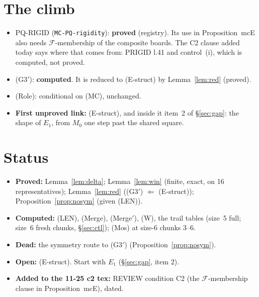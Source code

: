 \documentclass[11pt]{article}
\theoremstyle{definition}\newtheorem{definition}[theorem]{Definition}\newtheorem{remark}[theorem]{Remark}
\begin{document}
\section{The climb}\label{sec:climb}
\begin{itemize}
\item PQ-RIGID (\texttt{MC-PQ-rigidity}): \textbf{proved} (registry). Its use in Proposition~mcE also needs $\mathcal F$-membership of the composite boards. The C2 clause added today says where that comes from: PRIGID l.41 and control~(i), which is computed, not proved.
\item (G3$'$): \textbf{computed}. It is reduced to (E-struct) by Lemma~\ref{lem:red} (proved).
\item (Role): conditional on (MC), unchanged.
\item \textbf{First unproved link:} (E-struct), and inside it item~2 of \S\ref{sec:gap}: the shape of $E_1$, from $M_0$ one step past the shared square.
\end{itemize}

\section{Status}
\begin{itemize}
\item \textbf{Proved:} Lemma~\ref{lem:delta}; Lemma~\ref{lem:win} (finite, exact, on 16 representatives); Lemma~\ref{lem:red} ((G3$'$) $\Leftarrow$ (E-struct)); Proposition~\ref{prop:nosym} (given (LEN)).
\item \textbf{Computed:} (LEN), (Merge), (Merge$'$), (W), the trail tables (size~5 full; size~6 fresh chunks, \S\ref{sec:ctl}); (Mos) at size-6 chunks 3--6.
\item \textbf{Dead:} the symmetry route to (G3$'$) (Proposition~\ref{prop:nosym}).
\item \textbf{Open:} (E-struct). Start with $E_1$ (\S\ref{sec:gap}, item 2).
\item \textbf{Added to the 11-25 c2 tex:} REVIEW condition C2 (the $\mathcal F$-membership clause in Proposition~mcE), dated.
\end{itemize}
\end{document}
